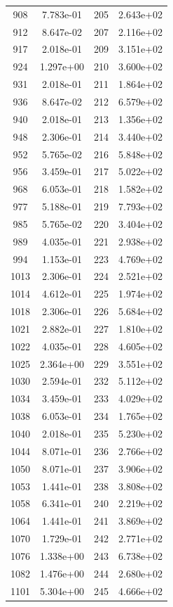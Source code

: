 \documentclass[12pt]{article}
\begin{document}
\begin{longtable}{@{}cccc@{}}
908 & 7.783e-01 & 205 & 2.643e+02 \\
912 & 8.647e-02 & 207 & 2.116e+02 \\
917 & 2.018e-01 & 209 & 3.151e+02 \\
924 & 1.297e+00 & 210 & 3.600e+02 \\
931 & 2.018e-01 & 211 & 1.864e+02 \\
936 & 8.647e-02 & 212 & 6.579e+02 \\
940 & 2.018e-01 & 213 & 1.356e+02 \\
948 & 2.306e-01 & 214 & 3.440e+02 \\
952 & 5.765e-02 & 216 & 5.848e+02 \\
956 & 3.459e-01 & 217 & 5.022e+02 \\
968 & 6.053e-01 & 218 & 1.582e+02 \\
977 & 5.188e-01 & 219 & 7.793e+02 \\
985 & 5.765e-02 & 220 & 3.404e+02 \\
989 & 4.035e-01 & 221 & 2.938e+02 \\
994 & 1.153e-01 & 223 & 4.769e+02 \\
1013 & 2.306e-01 & 224 & 2.521e+02 \\
1014 & 4.612e-01 & 225 & 1.974e+02 \\
1018 & 2.306e-01 & 226 & 5.684e+02 \\
1021 & 2.882e-01 & 227 & 1.810e+02 \\
1022 & 4.035e-01 & 228 & 4.605e+02 \\
1025 & 2.364e+00 & 229 & 3.551e+02 \\
1030 & 2.594e-01 & 232 & 5.112e+02 \\
1034 & 3.459e-01 & 233 & 4.029e+02 \\
1038 & 6.053e-01 & 234 & 1.765e+02 \\
1040 & 2.018e-01 & 235 & 5.230e+02 \\
1044 & 8.071e-01 & 236 & 2.766e+02 \\
1050 & 8.071e-01 & 237 & 3.906e+02 \\
1053 & 1.441e-01 & 238 & 3.808e+02 \\
1058 & 6.341e-01 & 240 & 2.219e+02 \\
1064 & 1.441e-01 & 241 & 3.869e+02 \\
1070 & 1.729e-01 & 242 & 2.771e+02 \\
1076 & 1.338e+00 & 243 & 6.738e+02 \\
1082 & 1.476e+00 & 244 & 2.680e+02 \\
1101 & 5.304e+00 & 245 & 4.666e+02 \\

\end{longtable}
\end{document}

